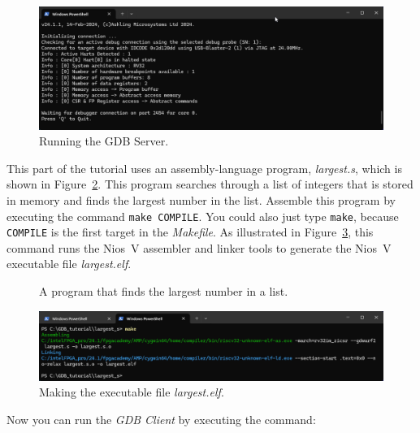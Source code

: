 \documentclass[11pt, twoside, pdftex]{article}
\begin{document}
\begin{figure}[h]
    \begin{center}
        \includegraphics[scale=.55]{figures/server.png}
        \caption{Running the GDB Server.}
        \label{fig:server}
    \end{center}
\end{figure}

This part of the tutorial uses an assembly-language program, {\it largest.s}, which is shown 
in Figure~\ref{fig:largest_code}. This program searches through a list of integers that is 
stored in memory and finds the largest number in the list. Assemble this program by 
executing the command \texttt{make COMPILE}.
You could also just type \texttt{make}, because \texttt{COMPILE} is the first target in the 
{\it Makefile}. As illustrated in Figure~\ref{fig:make_largest}, this command runs the Nios~V
assembler and linker tools to generate the Nios~V executable file {\it largest.elf}.

\begin{figure}[H]

	\caption{A program that finds the largest number in a list.}
	\label{fig:largest_code}
\end{figure}

\begin{figure}[h]
    \begin{center}
        \includegraphics[scale=.55]{figures/make_largest.png}
        \caption{Making the executable file {\it largest.elf}.}
        \label{fig:make_largest}
    \end{center}
\end{figure}

Now you can run the {\it GDB Client} by executing the command:
\end{document}
